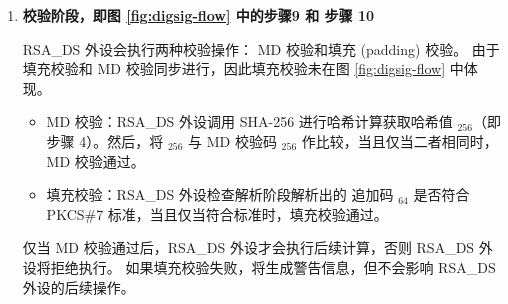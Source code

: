 \documentclass[main\_\_CN.tex]{subfiles}
\begin{document}
\begin{enumerate}
        通过 \begin{math}P\end{math}，RSA\_DS 外设能够解析出 \begin{math}[Y]_{3072}\end{math}、\begin{math}[M]_{3072}\end{math}、\begin{math}[\overline{r}]_{3072}\end{math}、\begin{math}[M^{\prime}]_{32}\end{math}、\begin{math}[L]_{32}\end{math}、MD 校验码和追加码 \begin{math}[\beta]_{64} \end{math}，这相当于步骤 5 的逆过程。
        
    \item {\bfseries 校验阶段，即图 \ref{fig:digsig-flow} 中的步骤9 和 步骤 10}
        
        RSA\_DS 外设会执行两种校验操作： MD 校验和填充 (padding) 校验。 
        由于填充校验和 MD 校验同步进行，因此填充校验未在图 \ref{fig:digsig-flow} 中体现。 
        
        
        \begin{itemize}
    
            \item MD 校验：RSA\_DS 外设调用 SHA-256 进行哈希计算获取哈希值 \begin{math}[CALC\_MD]_{256}\end{math}（即步骤 4）。然后，将 \begin{math}[CALC\_MD]_{256}\end{math} 与 MD 校验码 \begin{math}[MD]_{256}\end{math} 作比较，当且仅当二者相同时，MD 校验通过。
            
            \item 填充校验：RSA\_DS 外设检查解析阶段解析出的 追加码 \begin{math}[\beta]_{64} \end{math} 是否符合 PKCS\#7 标准，当且仅当符合标准时，填充校验通过。
                    
        \end{itemize}
        
        仅当 MD 校验通过后，RSA\_DS 外设才会执行后续计算，否则 RSA\_DS 外设将拒绝执行。
        如果填充校验失败，将生成警告信息，但不会影响 RSA\_DS 外设的后续操作。
    

\end{enumerate}
\end{document}
